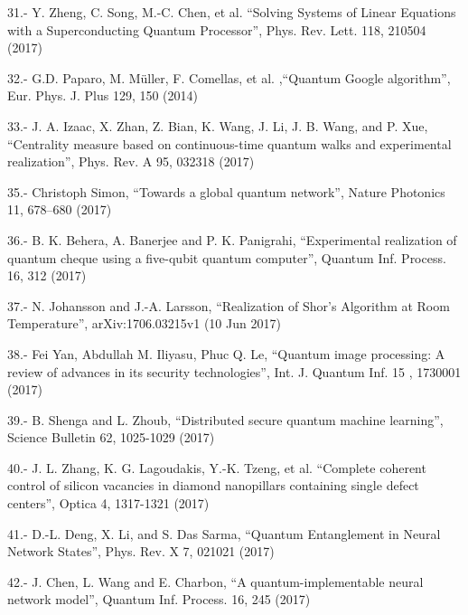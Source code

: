 31.- Y. Zheng, C. Song, M.-C. Chen, et al. “Solving Systems of Linear Equations with a Superconducting Quantum Processor”, Phys. Rev. Lett. 118, 210504 (2017)

32.- G.D. Paparo, M. Müller, F. Comellas, et al. ,“Quantum Google algorithm”, Eur. Phys. J. Plus 129, 150 (2014)

33.- J. A. Izaac, X. Zhan, Z. Bian, K. Wang, J. Li, J. B. Wang, and P. Xue, “Centrality measure based on continuous-time quantum walks and experimental realization”, Phys. Rev. A 95, 032318 (2017)


35.- Christoph Simon, “Towards a global quantum network”, Nature Photonics 11, 678–680 (2017)

36.- B. K. Behera, A. Banerjee and P. K. Panigrahi, “Experimental realization of quantum cheque using a five-qubit quantum computer”, Quantum Inf. Process. 16, 312 (2017)

37.- N. Johansson and J.-A. Larsson, “Realization of Shor’s Algorithm at Room Temperature”, arXiv:1706.03215v1 (10 Jun 2017)

38.- Fei Yan, Abdullah M. Iliyasu, Phuc Q. Le, “Quantum image processing: A review of advances in its security technologies”, Int. J. Quantum Inf. 15 , 1730001 (2017)

39.- B. Shenga and L. Zhoub, “Distributed secure quantum machine learning”, Science Bulletin 62, 1025-1029 (2017)

40.- J. L. Zhang, K. G. Lagoudakis, Y.-K. Tzeng, et al. “Complete coherent control of silicon vacancies in diamond nanopillars containing single defect centers”, Optica 4, 1317-1321 (2017)

41.- D.-L. Deng, X. Li, and S. Das Sarma, “Quantum Entanglement in Neural Network States”, Phys.  Rev. X 7, 021021 (2017)

42.- J. Chen, L. Wang and E. Charbon, “A quantum-implementable neural network model”, Quantum Inf. Process. 16, 245 (2017)


